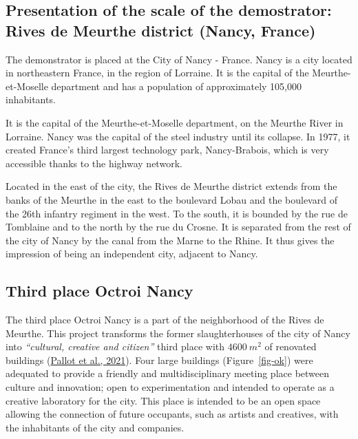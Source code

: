 \documentclass[
  11pt,
]{article}
\begin{document}
\hypertarget{presentation-of-the-scale-of-the-demostrator-rives-de-meurthe-district-nancy-france}{%
\subsection{Presentation of the scale of the demostrator: Rives de
Meurthe district (Nancy,
France)}\label{presentation-of-the-scale-of-the-demostrator-rives-de-meurthe-district-nancy-france}}

The demonstrator is placed at the City of Nancy - France. Nancy is a
city located in northeastern France, in the region of Lorraine. It is
the capital of the Meurthe-et-Moselle department and has a population of
approximately 105,000 inhabitants.

It is the capital of the Meurthe-et-Moselle department, on the Meurthe
River in Lorraine. Nancy was the capital of the steel industry until its
collapse. In 1977, it created France's third largest technology park,
Nancy-Brabois, which is very accessible thanks to the highway network.

Located in the east of the city, the Rives de Meurthe district extends
from the banks of the Meurthe in the east to the boulevard Lobau and the
boulevard of the 26th infantry regiment in the west. To the south, it is
bounded by the rue de Tomblaine and to the north by the rue du Crosne.
It is separated from the rest of the city of Nancy by the canal from the
Marne to the Rhine. It thus gives the impression of being an independent
city, adjacent to Nancy.

\hypertarget{third-place-octroi-nancy}{%
\subsection{Third place Octroi Nancy}\label{third-place-octroi-nancy}}

The third place Octroi Nancy is a part of the neighborhood of the Rives
de Meurthe. This project transforms the former slaughterhouses of the
city of Nancy into \emph{``cultural, creative and citizen''} third place
with \(4600~m^2\) of renovated buildings
(\protect\hyperlink{ref-pallot2021}{Pallot et al., 2021}). Four large
buildings (Figure~\ref{fig-ok}) were adequated to provide a friendly and
multidisciplinary meeting place between culture and innovation; open to
experimentation and intended to operate as a creative laboratory for the
city. This place is intended to be an open space allowing the connection
of future occupants, such as artists and creatives, with the inhabitants
of the city and companies.
\end{document}
